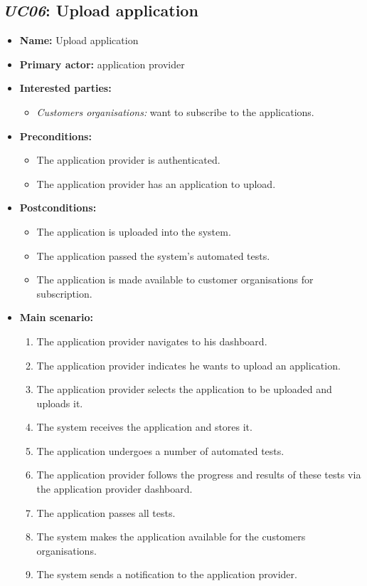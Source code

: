 \subsection{\emph{UC06}: Upload application}
\begin{itemize}
    \item \textbf{Name:} Upload application
    \item \textbf{Primary actor:} application provider
    \item \textbf{Interested parties:}
        \begin{itemize}
            \item \textit{Customers organisations:} want to subscribe to the applications.
        \end{itemize}

    \item \textbf{Preconditions:}
        \begin{itemize}
            \item The application provider is authenticated.
            \item The application provider has an application to upload.
        \end{itemize}

    \item \textbf{Postconditions:}
        \begin{itemize}
            \item The application is uploaded into the system.
            \item The application passed the system's automated tests.
            \item The application is made available to customer organisations for subscription.
        \end{itemize}

    \item \textbf{Main scenario:}
    \begin{enumerate}
       \item The application provider navigates to his dashboard.
       \item The application provider indicates he wants to upload an application.
       \item The application provider selects the application to be uploaded and
             uploads it.
       \item The system receives the application and stores it.
       \item The application undergoes a number of automated tests.
       \item The application provider follows the progress and results
             of these tests via the application provider dashboard.
       \item The application passes all tests.
       \item The system makes the application available for the customers organisations.
       \item The system sends a notification to the application provider.
    \end{enumerate}


\end{itemize}
